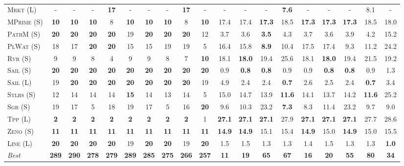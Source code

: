 \documentclass[11pt,landscape]{article}
\begin{document}
\begin{table}[tb]
{\begin{tabular}{|l||ccccccccc||ccccccccc||}
\textsc{Mrkt} (L)&-&-&-&\textbf{17}&-&-&-&\textbf{17}&-&-&-&-&\textbf{7.6}&-&-&-&8.1&-\\
\textsc{MPrime} (S)&\textbf{10}&\textbf{10}&\textbf{10}&8&\textbf{10}&\textbf{10}&\textbf{10}&8&\textbf{10}&17.4&17.4&\textbf{17.3}&18.5&\textbf{17.3}&\textbf{17.3}&\textbf{17.3}&18.5&18.0\\
\textsc{PathM} (S)&\textbf{20}&\textbf{20}&\textbf{20}&\textbf{20}&19&\textbf{20}&\textbf{20}&\textbf{20}&12&3.7&3.6&\textbf{3.5}&4.3&3.7&3.6&3.9&4.2&15.2\\
\textsc{PlWat} (S)&18&17&\textbf{20}&\textbf{20}&15&15&19&19&5&16.4&15.8&\textbf{8.9}&10.4&17.5&17.4&9.3&11.2&24.2\\
\textsc{Rvr} (S)&9&9&8&4&9&9&8&7&\textbf{10}&18.1&\textbf{18.0}&19.4&25.6&18.1&\textbf{18.0}&19.4&21.5&19.2\\
\textsc{Sail} (S)&\textbf{20}&\textbf{20}&\textbf{20}&\textbf{20}&\textbf{20}&\textbf{20}&\textbf{20}&\textbf{20}&\textbf{20}&0.9&\textbf{0.8}&\textbf{0.8}&0.9&0.9&\textbf{0.8}&\textbf{0.8}&0.9&1.3\\
\textsc{Sail} (L)&19&\textbf{20}&\textbf{20}&\textbf{20}&\textbf{20}&\textbf{20}&\textbf{20}&\textbf{20}&19&4.9&2.4&2.4&\textbf{0.7}&2.6&2.5&2.4&\textbf{0.7}&3.4\\
\textsc{Stlrs} (S)&12&14&14&14&\textbf{15}&14&13&14&5&15.0&14.7&13.9&\textbf{11.6}&14.1&13.7&14.2&\textbf{11.6}&25.2\\
\textsc{Sgr} (S)&19&17&5&18&19&17&5&16&\textbf{20}&9.6&10.3&23.2&\textbf{7.3}&8.3&11.4&23.2&9.7&9.0\\
\textsc{Tpp} (L)&\textbf{2}&\textbf{2}&\textbf{2}&\textbf{2}&\textbf{2}&\textbf{2}&\textbf{2}&\textbf{2}&1&\textbf{27.1}&\textbf{27.1}&\textbf{27.1}&27.9&\textbf{27.1}&\textbf{27.1}&\textbf{27.1}&27.7&28.6\\
\textsc{Zeno} (S)&\textbf{11}&\textbf{11}&\textbf{11}&\textbf{11}&\textbf{11}&\textbf{11}&\textbf{11}&\textbf{11}&\textbf{11}&\textbf{14.9}&\textbf{14.9}&15.1&15.4&\textbf{14.9}&15.0&\textbf{14.9}&15.0&15.5\\
\textsc{Line} (L)&\textbf{20}&\textbf{20}&\textbf{20}&\textbf{20}&19&\textbf{20}&\textbf{20}&19&\textbf{20}&1.5&1.5&1.3&1.3&1.4&1.5&1.3&1.3&\textbf{1.0}
\\\hline
\textit{Best}&\textbf{289}&\textbf{290}&\textbf{278}&\textbf{279}&\textbf{289}&\textbf{285}&\textbf{275}&\textbf{266}&\textbf{257}&\textbf{11}&\textbf{19}&\textbf{65}&\textbf{67}&\textbf{16}&\textbf{20}&\textbf{55}&\textbf{80}&\textbf{34}\\\hline

        \end{tabular}}
        \caption{}
        \label{tab:table-2}
        \end{table}
        
\end{document}
